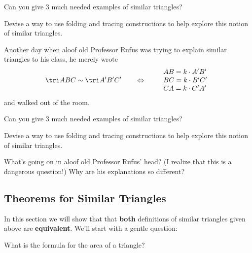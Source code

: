 \begin{question} 
Can you give $3$ much needed examples of similar triangles? 
\end{question}
\QM

\begin{question} 
Devise a way to use folding and tracing constructions to help explore this notion
of similar triangles.
\end{question}
\QM

Another day when aloof old Professor Rufus was trying to explain
similar triangles to his class, he merely wrote
\[
\tri ABC \sim \tri A'B'C' \qquad\Leftrightarrow \qquad
\begin{array}{l}
AB = k\cdot A'B'\\
BC = k\cdot B'C' \\
CA = k\cdot C'A'
\end{array}
\]
and walked out of the room.

\begin{question} 
Can you give $3$ much needed examples of similar triangles? 
\end{question}
\QM

\begin{question} 
Devise a way to use folding and tracing constructions to help explore this notion
of similar triangles.
\end{question}
\QM



\begin{question} 
What's going on in aloof old Professor Rufus' head?  (I realize that
this is a dangerous question!)  Why are his explanations so different?
\end{question}
\QM





\subsection{Theorems for Similar Triangles}

In this section we will show that that \textbf{both} definitions of similar
triangles given above are \textbf{equivalent}.  We'll start with a gentle
question:

\begin{question} What is the formula for the area of a triangle?
\end{question}
\QM

